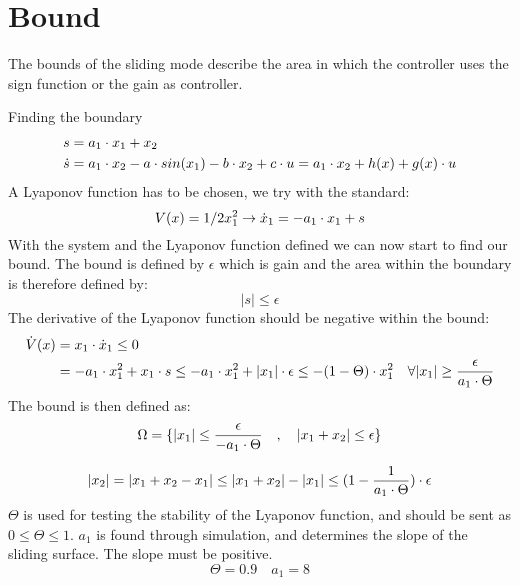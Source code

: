 \section{Bound} %
\label{sec:bound}
The bounds of the sliding mode describe the area in which the controller uses the sign function or the gain as controller.

Finding the boundary
\begin{equation}
\begin{split}
        s &= a_1 \cdot x_1 + x_2 \\
        \dot{s} &= a_1 \cdot x_2 - a \cdot sin(x_1) - b \cdot x_2 + c \cdot u = a_1 \cdot x_2 + h(x) + g(x) \cdot u
\end{split}
\end{equation}
A Lyaponov function has to be chosen, we try with the standard:
\begin{equation}
        V(x) = 1/2 x_1^2 \rightarrow \dot{x}_1 = -a_1 \cdot x_1 + s
\end{equation}
With the system and the Lyaponov function defined we can now start to find our bound. The bound is defined by $\epsilon$ which is gain and the area within the boundary is therefore defined by:
\begin{equation}
        \vert s \vert \leq \epsilon
\end{equation}
The derivative of the Lyaponov function should be negative within the bound:
\begin{equation}
        \begin{split}
                \dot{V}(x) &= x_1 \cdot \dot{x}_1 \leq 0 \\
                &= -a_1 \cdot x_1^2 + x_1 \cdot s \leq -a_1 \cdot x_1^2 + |x_1| \cdot \epsilon \leq -(1-\Theta) \cdot x_1^2 \quad \forall |x_1| \geq \frac{\epsilon}{a_1 \cdot \Theta}
        \end{split}
\end{equation}
The bound is then defined as:
\begin{equation}
        \Omega = \{ |x_1| \leq \frac{\epsilon}{-a_1 \cdot \Theta} \quad , \quad |x_1 + x_2| \leq \epsilon \}
\end{equation}

\begin{equation}
        |x_2| = |x_1 + x_2 - x_1| \leq |x_1 + x_2| - |x_1| \leq (1 - \frac{1}{a_1 \cdot \Theta}) \cdot \epsilon
\end{equation}
$\Theta$ is used for testing the stability of the Lyaponov function, and should be sent as $0 \leq \Theta \leq 1$. $a_1$ is found through simulation, and determines the slope of the sliding surface. The slope must be positive.
\begin{equation}
        \Theta = 0.9 \quad a_1 = 8
\end{equation}

